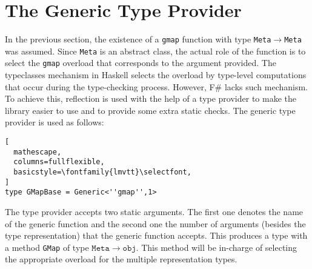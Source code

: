 \documentclass{sigplanconf}
\begin{document}
\section{The Generic Type Provider}
In the previous section, the existence of a \verb+gmap+ function with
type \verb+Meta+$\to$\verb+Meta+ was assumed. Since \verb+Meta+ is an
abstract class, the actual role of the function is to select the
\verb+gmap+ overload that corresponds to the argument provided. The
typeclasses mechanism in Haskell selects the overload by type-level
computations that occur during the type-checking process. However, F\#
lacks such mechanism. To achieve this, reflection is used with the
help of a type provider to make the library easier to use and to
provide some extra static checks. The generic type provider is used as
follows:
\begin{lstlisting}[
  mathescape,
  columns=fullflexible,
  basicstyle=\fontfamily{lmvtt}\selectfont,
]
type GMapBase = Generic<''gmap'',1>
\end{lstlisting}
The type provider accepts two static arguments. The first one denotes
the name of the generic function and the second one the number of
arguments (besides the type representation) that the generic function
accepts. This produces a type with a method \verb+GMap+ of type
$\mathtt{Meta} \to \mathtt{obj}$. This method will be in-charge of
selecting the appropriate overload for the multiple representation
types.
\end{document}
